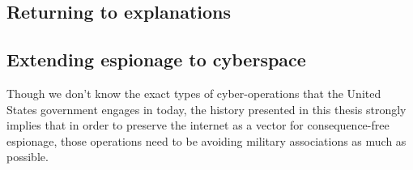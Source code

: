 \documentclass[11pt]{memoir}
\begin{document}

\subsection{Returning to explanations}



\subsection{Extending espionage to cyberspace}
Though we don't know the exact types of cyber-operations that the United States government engages in today, the history presented in this thesis strongly implies that in order to preserve the internet as a vector for consequence-free espionage, those operations need to be avoiding military associations as much as possible.
\end{document}
